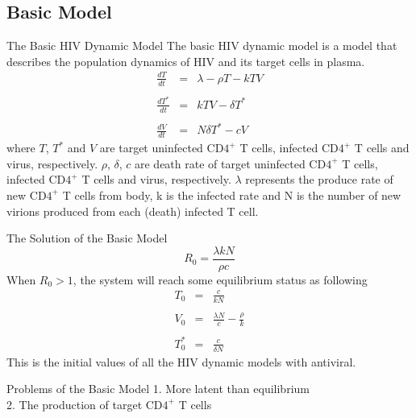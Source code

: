 \documentclass[9pt]{beamer}
\begin{document}
\subsection[Basic Model]{Basic Model}
\begin{frame}{The Basic HIV Dynamic Model}
The basic HIV dynamic model is a model that describes the population dynamics of HIV and its target cells in plasma.
\begin{equation}
\begin{array}{rcl}
\frac{dT}{dt} & = & \lambda{}-\rho{}T-kTV \\ \\
\frac{dT^{*}}{dt} & = & kTV-\delta{}T^{*} \\ \\
\frac{dV}{dt} & = & N\delta{}T^{*}-cV
\end{array}
\end{equation}
where $T$, $T^{*}$ and $V$ are target uninfected CD$4^{+}$ T cells, infected CD$4^{+}$ T cells and virus, respectively.  $\rho$, $\delta$, $c$ are death rate of target uninfected CD$4^{+}$ T cells, infected CD$4^{+}$ T cells and virus, respectively. $\lambda$ represents the produce rate of new CD$4^{+}$ T cells from body, k is the infected rate and N is the number of new virions produced from each (death) infected T cell.
\end{frame}

\begin{frame}{The Solution of the Basic Model}
\begin{equation}
R_{0}=\frac{\lambda{}kN}{\rho{}c}
\end{equation}
When $R_{0}>1$, the system will reach some equilibrium status as following
\begin{equation}
\begin{array}{rcl}
T_{0} & = & \frac{c}{kN} \\ \\
V_{0} & = & \frac{\lambda{}N}{c}-\frac{\rho}{k} \\ \\
T_{0}^{*} & = & \frac{c}{\delta{}N}
\end{array}
\end{equation}
This is the initial values of all the HIV dynamic models with antiviral. 
\end{frame}

\begin{frame}{Problems of the Basic Model}
1. More latent than equilibrium \\
2. The production of target CD$4^{+}$ T cells
\end{frame}
\end{document}
